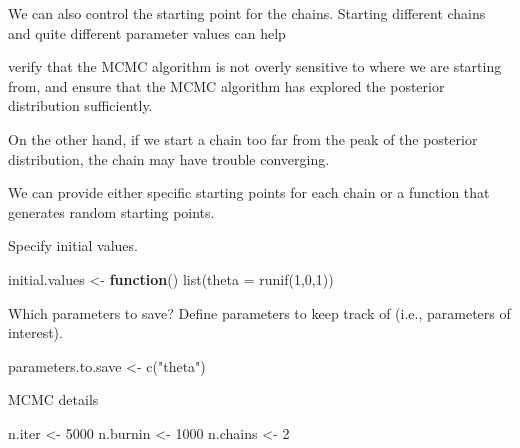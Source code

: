 \documentclass[
  12pt,
]{krantz}
\newenvironment{Shaded}{\begin{snugshade}}{\end{snugshade}}
\newcommand{\AttributeTok}[1]{\textcolor[rgb]{0.77,0.63,0.00}{#1}}
\newcommand{\ControlFlowTok}[1]{\textcolor[rgb]{0.13,0.29,0.53}{\textbf{#1}}}
\newcommand{\DecValTok}[1]{\textcolor[rgb]{0.00,0.00,0.81}{#1}}
\newcommand{\DocumentationTok}[1]{\textcolor[rgb]{0.56,0.35,0.01}{\textbf{\textit{#1}}}}
\newcommand{\FunctionTok}[1]{\textcolor[rgb]{0.00,0.00,0.00}{#1}}
\newcommand{\NormalTok}[1]{#1}
\newcommand{\OtherTok}[1]{\textcolor[rgb]{0.56,0.35,0.01}{#1}}
\newcommand{\StringTok}[1]{\textcolor[rgb]{0.31,0.60,0.02}{#1}}
\begin{document}
We can also control the starting point for the chains. Starting different chains and quite different parameter values can help

verify that the MCMC algorithm is not overly sensitive to where we are starting from, and
ensure that the MCMC algorithm has explored the posterior distribution sufficiently.

On the other hand, if we start a chain too far from the peak of the posterior distribution, the chain may have trouble converging.

We can provide either specific starting points for each chain or a function that generates random starting points.

Specify initial values.

\begin{Shaded}
\begin{Highlighting}[]
\NormalTok{initial.values }\OtherTok{\textless{}{-}} \ControlFlowTok{function}\NormalTok{() }\FunctionTok{list}\NormalTok{(}\AttributeTok{theta =} \FunctionTok{runif}\NormalTok{(}\DecValTok{1}\NormalTok{,}\DecValTok{0}\NormalTok{,}\DecValTok{1}\NormalTok{))}
\end{Highlighting}
\end{Shaded}

\begin{Shaded}
\end{Shaded}

Which parameters to save? Define parameters to keep track of (i.e., parameters of interest).

\begin{Shaded}
\begin{Highlighting}[]
\NormalTok{parameters.to.save }\OtherTok{\textless{}{-}} \FunctionTok{c}\NormalTok{(}\StringTok{"theta"}\NormalTok{)}
\end{Highlighting}
\end{Shaded}

MCMC details

\begin{Shaded}
\begin{Highlighting}[]
\NormalTok{n.iter }\OtherTok{\textless{}{-}} \DecValTok{5000}
\NormalTok{n.burnin }\OtherTok{\textless{}{-}} \DecValTok{1000}
\NormalTok{n.chains }\OtherTok{\textless{}{-}} \DecValTok{2}
\end{Highlighting}
\end{Shaded}
\end{document}
